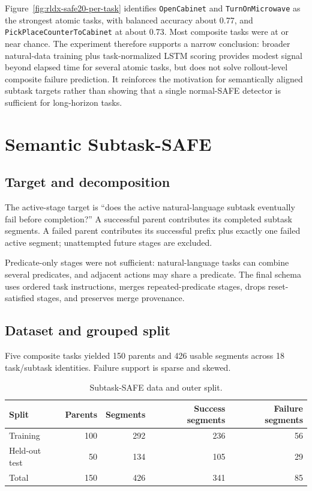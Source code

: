 \documentclass[11pt,a4paper]{article}
\newcommand{\code}[1]{\texttt{#1}}
\begin{document}
Figure~\ref{fig:rldx-safe20-per-task} identifies \code{OpenCabinet} and
\code{TurnOnMicrowave} as the strongest atomic tasks, with balanced accuracy
about 0.77, and \code{PickPlaceCounterToCabinet} at about 0.73. Most composite
tasks were at or near chance. The experiment therefore supports a narrow
conclusion: broader natural-data training plus task-normalized LSTM scoring
provides modest signal beyond elapsed time for several atomic tasks, but does
not solve rollout-level composite failure prediction. It reinforces the
motivation for semantically aligned subtask targets rather than showing that a
single normal-SAFE detector is sufficient for long-horizon tasks.

\section{Semantic Subtask-SAFE}

\subsection{Target and decomposition}
The active-stage target is ``does the active natural-language subtask eventually fail before completion?'' A successful parent contributes its completed subtask segments. A failed parent contributes its successful prefix plus exactly one failed active segment; unattempted future stages are excluded.

Predicate-only stages were not sufficient: natural-language tasks can combine several predicates, and adjacent actions may share a predicate. The final schema uses ordered task instructions, merges repeated-predicate stages, drops reset-satisfied stages, and preserves merge provenance.

\subsection{Dataset and grouped split}
Five composite tasks yielded 150 parents and 426 usable segments across 18 task/subtask identities. Failure support is sparse and skewed.

\begin{table}[H]
\centering
\caption{Subtask-SAFE data and outer split.}
\label{tab:subtask-split}
\begin{tabular}{lrrrr}
\toprule
Split & Parents & Segments & Success segments & Failure segments\\
\midrule
Training & 100 & 292 & 236 & 56\\
Held-out test & 50 & 134 & 105 & 29\\
Total & 150 & 426 & 341 & 85\\
\bottomrule
\end{tabular}
\end{table}
\end{document}
